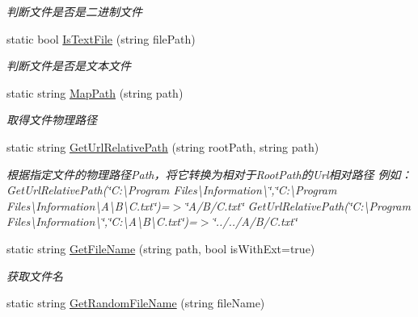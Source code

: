 \begin{DoxyCompactItemize}
\begin{DoxyCompactList}\small\item\em 判断文件是否是二进制文件 \end{DoxyCompactList}\item 
static bool \hyperlink{class_x_c_l_net_tools_1_1_file_handler_1_1_com_file_afddfff3c4a196399bc033df2b017b16c}{Is\+Text\+File} (string file\+Path)
\begin{DoxyCompactList}\small\item\em 判断文件是否是文本文件 \end{DoxyCompactList}\item 
static string \hyperlink{class_x_c_l_net_tools_1_1_file_handler_1_1_com_file_a98d090828121f63039a22838b065dfaa}{Map\+Path} (string path)
\begin{DoxyCompactList}\small\item\em 取得文件物理路径 \end{DoxyCompactList}\item 
static string \hyperlink{class_x_c_l_net_tools_1_1_file_handler_1_1_com_file_a87d1f27fa942e4682abc91f13ca79672}{Get\+Url\+Relative\+Path} (string root\+Path, string path)
\begin{DoxyCompactList}\small\item\em 根据指定文件的物理路径\+Path，将它转换为相对于\+Root\+Path的\+Url相对路径 例如： Get\+Url\+Relative\+Path(\char`\"{}\+C\+:\textbackslash{}\+Program Files\textbackslash{}\+Information\textbackslash{}\char`\"{},\char`\"{}\+C\+:\textbackslash{}\+Program Files\textbackslash{}\+Information\textbackslash{}\+A\textbackslash{}\+B\textbackslash{}\+C.\+txt\char`\"{})=$>$\char`\"{}\+A/\+B/\+C.\+txt\char`\"{} Get\+Url\+Relative\+Path(\char`\"{}\+C\+:\textbackslash{}\+Program Files\textbackslash{}\+Information\textbackslash{}\char`\"{},\char`\"{}\+C\+:\textbackslash{}\+A\textbackslash{}\+B\textbackslash{}\+C.\+txt\char`\"{})=$>$\char`\"{}../../\+A/\+B/\+C.\+txt\char`\"{} \end{DoxyCompactList}\item 
static string \hyperlink{class_x_c_l_net_tools_1_1_file_handler_1_1_com_file_a4f28a2c8a501f7ed76d5641a71d2b209}{Get\+File\+Name} (string path, bool is\+With\+Ext=true)
\begin{DoxyCompactList}\small\item\em 获取文件名 \end{DoxyCompactList}\item 
static string \hyperlink{class_x_c_l_net_tools_1_1_file_handler_1_1_com_file_aa660609982dc68f33088a7388e34bd1b}{Get\+Random\+File\+Name} (string file\+Name)

\end{DoxyCompactItemize}

